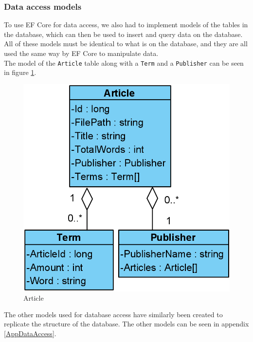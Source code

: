 \subsubsection*{Data access models}
To use EF Core for data access, we also had to implement models of the tables in the database, which can then be used to insert and query data on the database. 
All of these models must be identical to what is on the database, and they are all used the same way by EF Core to manipulate data.
\\
The model of the \texttt{Article} table along with a \texttt{Term} and a \texttt{Publisher} can be seen in figure \ref*{Article}. 
\begin{figure}[H]
    \centering
    \includegraphics[scale=0.25]{Images/ArticleModel.PNG}
    \caption{Article}
    \label{Article}
\end{figure}
The other models used for database access have  similarly been created to replicate the structure of the database. 
The other models can be seen in appendix \ref*{AppDataAccess}.